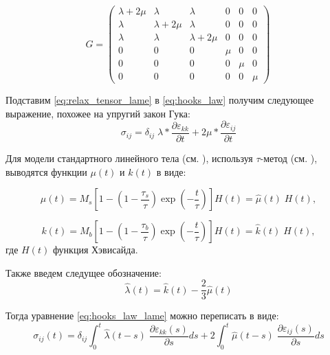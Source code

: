 \documentclass[a4paper, fontsize=14pt]{article}
\begin{document}
\begin{equation*}
    G = \left(\begin{array}{ccc|ccc}
        \lambda + 2 \mu & \lambda & \lambda & 0 & 0 & 0 \\
        \lambda & \lambda + 2 \mu & \lambda & 0 & 0 & 0 \\
        \lambda & \lambda & \lambda + 2 \mu & 0 & 0 & 0 \\
        \hline
        0 & 0 & 0 & \mu & 0 & 0 \\
        0 & 0 & 0 & 0 & \mu & 0 \\
        0 & 0 & 0 & 0 & 0 & \mu 
        \end{array}\right)\,
\end{equation*}

Подставим \eqref{eq:relax_tensor_lame} в \eqref{eq:hooks_law} получим следующее выражение, похожее на упругий закон Гука:
\begin{equation}
    \label{eq:hooks_law_lame}
    \sigma_{ij} = \delta_{ij} \; \lambda \ast \frac{\partial \varepsilon_{kk}}{\partial t} + 2 \mu \ast \frac{\partial \varepsilon_{ij}}{\partial t}
\end{equation}

Для модели стандартного линейного тела (см. \cite{Mainardi,Carcione}), используя $\tau$-метод (см. \cite{Bohlen}), выводятся функции $\mu(t)$ и $k(t)$ в виде:

\begin{equation}
    \label{eq:mu}
    \mu(t) = M_s \left[ 1 - \left(1 - \frac{\tau_s}{\tau}\right) \exp \left( - \frac{t}{\tau} \right)\right] H (t) = \hat{\mu}(t) \; H(t),
\end{equation}

\begin{equation}
    \label{eq:k}
    k(t) = M_b \left[ 1 - \left(1 - \frac{\tau_b}{\tau}\right) \exp \left( - \frac{t}{\tau} \right)\right] H (t) = \hat{k}(t) \; H(t),
\end{equation}
где $H(t)$ функция Хэвисайда.

    Также введем следущее обозначение:
    \begin{equation}
        \hat{\lambda}(t) = \hat{k}(t) - \frac{2}{3}\hat{\mu}(t)
    \end{equation}

Тогда уравнение \eqref{eq:hooks_law_lame} можно переписать в виде:
\begin{equation}
    \label{eq:hooks_law_hat}
    \sigma_{ij}(t) = \delta_{ij} \int_0^t \hat{\lambda}(t - s) \; \frac{\partial \varepsilon_{kk}(s)}{\partial s} ds + 2 \int_0^t \hat{\mu}(t - s) \; \frac{\partial \varepsilon_{ij}(s)}{\partial s} ds  
\end{equation}
\end{document}
